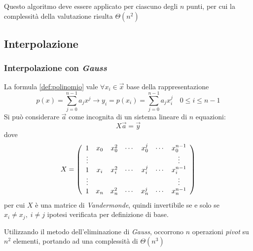 Questo algoritmo deve essere applicato per ciascuno degli $n$ punti, per cui la complessità della valutazione risulta $\Theta \left( n^2 \right)$

\subsection{Interpolazione}
\subsubsection{Interpolazione con \textit{Gauss}}
La formula \ref{def:polinomio} vale $\forall x_i \in \vec{x}$ base della rappresentazione
\begin{equation*}
    p(x) = \sum_{j=0}^{n-1}a_j x^j
    \rightarrow y_i = p(x_i) = \sum_{j=0}^{n-1}a_j x_i^j
    \quad 0 \leq i \leq n-1
\end{equation*}
Si può considerare $\vec{a}$ come incognita di un sistema lineare di $n$ equazioni:
\begin{equation*}
    X \vec{a} = \vec{y}
\end{equation*}
dove
\begin{equation*}
    X = \left( 
        \begin{array}[h]{ccccccc}
            1 & x_0 & x_0^2 & \cdots & x_0^j & \cdots & x_0^{n-1} \\
            \vdots &&&&&& \vdots\\
            1 & x_i & x_i^2 & \cdots & x_i^j & \cdots & x_i^{n-1} \\
            \vdots &&&&&& \vdots\\
            1 & x_n & x_n^2 & \cdots & x_n^j & \cdots & x_n^{n-1} 
        \end{array}
    \right)
\end{equation*}
per cui $X$ è una matrice di \textit{Vandermonde}, quindi invertibile se e solo se $x_i \neq x_j, \; i\neq j$ ipotesi verificata per definizione di base.

Utilizzando il metodo dell'eliminazione di \textit{Gauss}, occorrono $n$ operazioni \textit{pivot} su $n^2$ elementi, portando ad una complessità di $\Theta \left( n^3 \right)$

